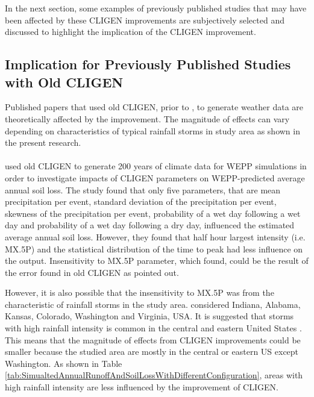 In the next section, some examples of previously published studies that may have
been affected by these CLIGEN improvements are subjectively selected and
discussed to highlight the implication of the CLIGEN improvement.

\subsection{Implication for Previously Published Studies with Old CLIGEN}

Published papers that used old CLIGEN, prior to \citet{yu2000-301}, to generate
weather data are theoretically affected by the improvement. The magnitude
of effects can vary depending on characteristics of typical rainfall storms in
study area as shown in the present research.

\paragraph{\citet{baffaut1996-447}} used old CLIGEN to generate 200 years of
climate data for WEPP simulations in order to investigate impacts of CLIGEN
parameters on WEPP-predicted average annual soil loss. The study found that only
five parameters, that are mean precipitation per event, standard deviation of
the precipitation per event, skewness of the precipitation per event,
probability of a wet day following a wet day and probability of a wet day
following a dry day, influenced the estimated average annual soil loss. However,
they found that half hour largest intensity (i.e. {MX.5P}) and the statistical
distribution of the time to peak had less influence on the output. Insensitivity
to {MX.5P} parameter, which \citet{baffaut1996-447} found, could be the result
of the error found in old CLIGEN as \citet{yu2000-301} pointed out.

However, it is also possible that the insensitivity to {MX.5P} was from
the characteristic of rainfall storms in the study area. \citet{baffaut1996-447}
considered Indiana, Alabama, Kansas, Colorado, Washington and Virginia, USA. It
is suggested that storms with high rainfall intensity is common in the central
and eastern United States \citep{ashley2003-3003}. This means that the magnitude
of effects from CLIGEN improvements could be smaller because the studied
area are mostly in the central or eastern US except Washington. As shown in
Table \ref{tab:SimualtedAnnualRunoffAndSoilLossWithDifferentConfiguration},
areas with high rainfall intensity are less influenced by the improvement of
CLIGEN.

